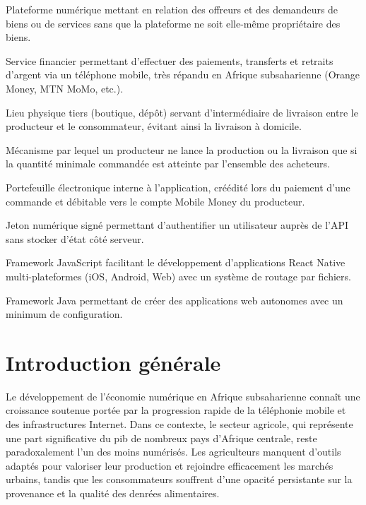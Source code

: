 \documentclass[12pt, a4paper, oneside]{report}
\begin{document}
\begin{description}[leftmargin=3.5cm, style=nextline]
  \item[Marketplace]
    Plateforme numérique mettant en relation des offreurs et des demandeurs de biens ou
    de services sans que la plateforme ne soit elle-même propriétaire des biens.
  \item[Mobile Money]
    Service financier permettant d'effectuer des paiements, transferts et retraits d'argent
    via un téléphone mobile, très répandu en Afrique subsaharienne
    (Orange Money, MTN MoMo, etc.).
  \item[Point relais]
    Lieu physique tiers (boutique, dépôt) servant d'intermédiaire de livraison entre le
    producteur et le consommateur, évitant ainsi la livraison à domicile.
  \item[Offre groupée]
    Mécanisme par lequel un producteur ne lance la production ou la livraison que si la
    quantité minimale commandée est atteinte par l'ensemble des acheteurs.
  \item[Wallet virtuel]
    Portefeuille électronique interne à l'application, créédité lors du paiement d'une
    commande et débitable vers le compte Mobile Money du producteur.
  \item[Token JWT]
    Jeton numérique signé permettant d'authentifier un utilisateur auprès de l'API sans
    stocker d'état côté serveur.
  \item[Expo / Expo Router]
    Framework JavaScript facilitant le développement d'applications React Native
    multi-plateformes (iOS, Android, Web) avec un système de routage par fichiers.
  \item[Spring Boot]
    Framework Java permettant de créer des applications web autonomes avec un minimum
    de configuration.
\end{description}

\setcounter{page}{1}

\chapter{Introduction générale}

Le développement de l'économie numérique en Afrique subsaharienne connaît une croissance
soutenue portée par la progression rapide de la téléphonie mobile et des infrastructures
Internet. Dans ce contexte, le secteur agricole, qui représente une part significative du
\gls{pib} de nombreux pays d'Afrique centrale, reste paradoxalement l'un des moins
numérisés. Les agriculteurs manquent d'outils adaptés pour valoriser leur production et
rejoindre efficacement les marchés urbains, tandis que les consommateurs souffrent d'une
opacité persistante sur la provenance et la qualité des denrées alimentaires.
\end{document}
